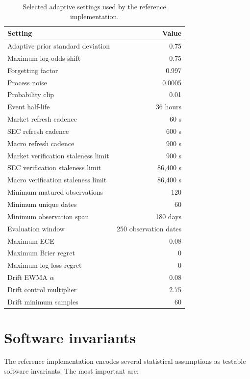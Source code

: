 \documentclass[11pt]{article}
\begin{document}
\begin{table}[tbp]
\centering
\small
\caption{Selected adaptive settings used by the reference implementation.}
\label{tab:adaptiveconfig}
\begin{tabular}{@{}lr@{}}
\toprule
Setting & Value \\
\midrule
Adaptive prior standard deviation & 0.75 \\
Maximum log-odds shift & 0.75 \\
Forgetting factor & 0.997 \\
Process noise & 0.0005 \\
Probability clip & 0.01 \\
Event half-life & 36 hours \\
Market refresh cadence & 60 s \\
SEC refresh cadence & 600 s \\
Macro refresh cadence & 900 s \\
Market verification staleness limit & 900 s \\
SEC verification staleness limit & 86,400 s \\
Macro verification staleness limit & 86,400 s \\
Minimum matured observations & 120 \\
Minimum unique dates & 60 \\
Minimum observation span & 180 days \\
Evaluation window & 250 observation dates \\
Maximum ECE & 0.08 \\
Maximum Brier regret & 0 \\
Maximum log-loss regret & 0 \\
Drift EWMA $\alpha$ & 0.08 \\
Drift control multiplier & 2.75 \\
Drift minimum samples & 60 \\
\bottomrule
\end{tabular}
\end{table}

\section{Software invariants}
\label{app:invariants}

The reference implementation encodes several statistical assumptions as testable software invariants. The most important are:
\end{document}
